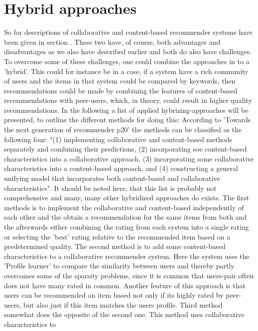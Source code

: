 \section{Hybrid approaches}
So far descriptions of collaborative and content-based recommender systems have been given in section . These two have, of course, both advantages and disadvantages as we also have described earlier and both do also have challenges. To overcome some of these challenges, one could combine the approaches in to a 'hybrid'. This could for instance be in a case, if a system have a rich community of users and the items in that system could be compared by keywords, then recommendations could be made by combining the features of content-based recommendations with peer-users, which, in theory, could result in higher quality recommendations.
In the following a list of applied hybrizing-approaches will be presented, to outline the different methods for doing this:
According to 'Towards the next generation of recommender p20' the methods can be classified as the following four: "(1) implementing collaborative and content-based methods separately and combining their predictions, (2) incorporating soe content-based characteristics into a collaborative approach, (3) incorporating some collaborative characteristics into a content-based approach, and (4) constructing a general unifying model that incorporates both content-based and collaborative characteristics". It should be noted here, that this list is probably not comprehensive and many, many other hybridized approaches do exists. 
The first methods is to implement the collaborative and content-based independently of each other and the obtain a recommendation for the same items from both and the afterwards either combining the rating from each system into a single rating or selecting the 'best' rating relative to the recommended item based on a predetermined quality. 
The second method is to add some content-based characteristics to a collaborative recommender system. Here the system uses the 'Profile learner' to compare the similarity between users and thereby partly overcomes some of the sparsity problems, since it is common that users-pair often does not have many rated in common. Another feature of this approach is that users can be recommended an item based not only if its highly rated by peer-users, but also just if this item matches the users profile. 
Third method somewhat does the opposite of the second one. This method uses collaborative characteristics to  
